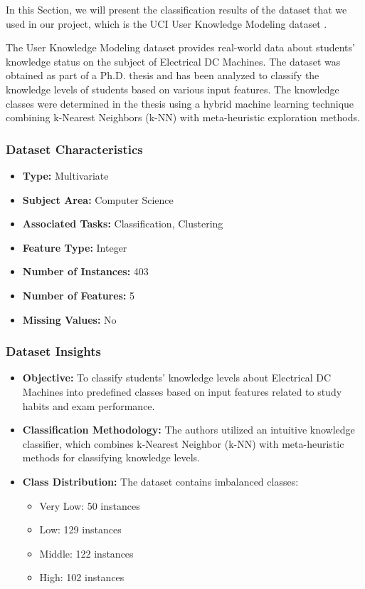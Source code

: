 \newpage
\setcounter{section}{3}
\setcounter{subsection}{0}

In this Section, we will present the classification results of the dataset that we used in our project, which is the UCI User Knowledge Modeling dataset \cite{user_knowledge_modeling}.

The User Knowledge Modeling dataset provides real-world data about students' knowledge status on the subject of Electrical DC Machines. The dataset was obtained as part of a Ph.D. thesis and has been analyzed to classify the knowledge levels of students based on various input features. The knowledge classes were determined in the thesis using a hybrid machine learning technique combining k-Nearest Neighbors (k-NN) with meta-heuristic exploration methods.

\subsubsection*{Dataset Characteristics}
\begin{itemize}
    \item \textbf{Type:} Multivariate
    \item \textbf{Subject Area:} Computer Science
    \item \textbf{Associated Tasks:} Classification, Clustering
    \item \textbf{Feature Type:} Integer
    \item \textbf{Number of Instances:} 403
    \item \textbf{Number of Features:} 5
    \item \textbf{Missing Values:} No
\end{itemize}

\subsubsection*{Dataset Insights}
\begin{itemize}
    \item \textbf{Objective:} To classify students' knowledge levels about Electrical DC Machines into predefined classes based on input features related to study habits and exam performance.
    \item \textbf{Classification Methodology:} The authors utilized an intuitive knowledge classifier, which combines k-Nearest Neighbor (k-NN) with meta-heuristic methods for classifying knowledge levels.
    \item \textbf{Class Distribution:} The dataset contains imbalanced classes:
    \begin{itemize}
        \item Very Low: 50 instances
        \item Low: 129 instances
        \item Middle: 122 instances
        \item High: 102 instances
    \end{itemize}
\end{itemize}

